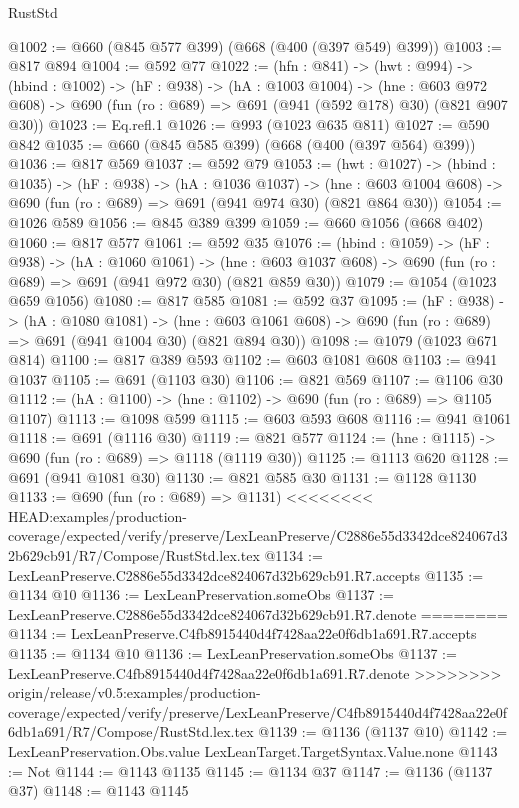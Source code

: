 \begin{lexlean}{RustStd}
\begin{coremodule}
{\begin{coremodule}
@1002 := @660 (@845 @577 @399) (@668 (@400 (@397 @549) @399))
@1003 := @817 @894
@1004 := @592 @77
@1022 := (hfn : @841) ->
  (hwt : @994) ->
  (hbind : @1002) ->
  (hF : @938) ->
  (hA : @1003 @1004) ->
  (hne : @603 @972 @608) -> @690 (fun (ro : @689) => @691 (@941 (@592 @178) @30) (@821 @907 @30))
@1023 := Eq.refl.{1}
@1026 := @993 (@1023 @635 @811)
@1027 := @590 @842
@1035 := @660 (@845 @585 @399) (@668 (@400 (@397 @564) @399))
@1036 := @817 @569
@1037 := @592 @79
@1053 := (hwt : @1027) ->
  (hbind : @1035) ->
  (hF : @938) ->
  (hA : @1036 @1037) ->
  (hne : @603 @1004 @608) -> @690 (fun (ro : @689) => @691 (@941 @974 @30) (@821 @864 @30))
@1054 := @1026 @589
@1056 := @845 @389 @399
@1059 := @660 @1056 (@668 @402)
@1060 := @817 @577
@1061 := @592 @35
@1076 := (hbind : @1059) ->
  (hF : @938) ->
  (hA : @1060 @1061) ->
  (hne : @603 @1037 @608) -> @690 (fun (ro : @689) => @691 (@941 @972 @30) (@821 @859 @30))
@1079 := @1054 (@1023 @659 @1056)
@1080 := @817 @585
@1081 := @592 @37
@1095 := (hF : @938) ->
  (hA : @1080 @1081) ->
  (hne : @603 @1061 @608) -> @690 (fun (ro : @689) => @691 (@941 @1004 @30) (@821 @894 @30))
@1098 := @1079 (@1023 @671 @814)
@1100 := @817 @389 @593
@1102 := @603 @1081 @608
@1103 := @941 @1037
@1105 := @691 (@1103 @30)
@1106 := @821 @569
@1107 := @1106 @30
@1112 := (hA : @1100) -> (hne : @1102) -> @690 (fun (ro : @689) => @1105 @1107)
@1113 := @1098 @599
@1115 := @603 @593 @608
@1116 := @941 @1061
@1118 := @691 (@1116 @30)
@1119 := @821 @577
@1124 := (hne : @1115) -> @690 (fun (ro : @689) => @1118 (@1119 @30))
@1125 := @1113 @620
@1128 := @691 (@941 @1081 @30)
@1130 := @821 @585 @30
@1131 := @1128 @1130
@1133 := @690 (fun (ro : @689) => @1131)
<<<<<<<< HEAD:examples/production-coverage/expected/verify/preserve/LexLeanPreserve/C2886e55d3342dce824067d32b629cb91/R7/Compose/RustStd.lex.tex
@1134 := LexLeanPreserve.C2886e55d3342dce824067d32b629cb91.R7.accepts
@1135 := @1134 @10
@1136 := LexLeanPreservation.someObs
@1137 := LexLeanPreserve.C2886e55d3342dce824067d32b629cb91.R7.denote
========
@1134 := LexLeanPreserve.C4fb8915440d4f7428aa22e0f6db1a691.R7.accepts
@1135 := @1134 @10
@1136 := LexLeanPreservation.someObs
@1137 := LexLeanPreserve.C4fb8915440d4f7428aa22e0f6db1a691.R7.denote
>>>>>>>> origin/release/v0.5:examples/production-coverage/expected/verify/preserve/LexLeanPreserve/C4fb8915440d4f7428aa22e0f6db1a691/R7/Compose/RustStd.lex.tex
@1139 := @1136 (@1137 @10)
@1142 := LexLeanPreservation.Obs.value LexLeanTarget.TargetSyntax.Value.none
@1143 := Not
@1144 := @1143 @1135
@1145 := @1134 @37
@1147 := @1136 (@1137 @37)
@1148 := @1143 @1145

\end{coremodule}}
\end{coremodule}
\end{lexlean}
